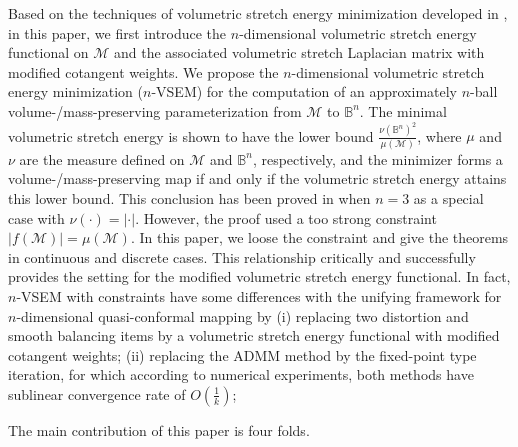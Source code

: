 \documentclass{article}
\begin{document}
Based on the techniques of volumetric stretch energy minimization developed in \cite{MHTL19,TMWH23}, in this paper, we first introduce the $n$-dimensional volumetric stretch energy functional on $\mathcal{M}$ and the associated volumetric stretch Laplacian matrix with modified cotangent weights. We propose the $n$-dimensional volumetric stretch energy minimization ($n$-VSEM) for the computation of an approximately $n$-ball volume-/mass-preserving parameterization from $\mathcal{M}$ to $\mathbb{B}^n$. The minimal volumetric stretch energy is shown to have the lower bound $\frac{\nu(\mathbb{B}^n)^2}{\mu(\mathcal{M})}$, where $\mu$ and $\nu$ are the measure defined on $\mathcal{M}$ and $\mathbb{B}^n$, respectively, and the minimizer forms a volume-/mass-preserving map if and only if the volumetric stretch energy attains this lower bound. This conclusion has been proved in \cite{TMWH23} when $n = 3$ as a special case with $\nu(\cdot) = |\cdot|$.
However, the proof used a too strong constraint $|f(\mathcal{M})| = \mu(\mathcal{M})$. In this paper, we loose the constraint and give the theorems in continuous and discrete cases. This relationship critically and successfully provides the setting for the modified volumetric stretch energy functional.
In fact, $n$-VSEM with constraints have some differences with the unifying framework for $n$-dimensional quasi-conformal mapping by (i) replacing two distortion and smooth balancing items by a volumetric stretch energy functional with modified cotangent weights; (ii) replacing the ADMM method by the fixed-point type iteration, for which according to numerical experiments, both methods have sublinear convergence rate of $O(\frac{1}{k})$;

The main contribution of this paper is four folds.
\end{document}
